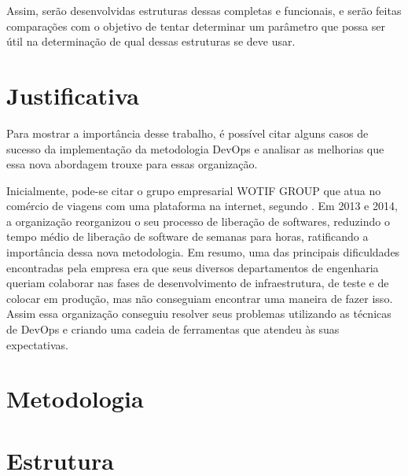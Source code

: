 Assim, serão desenvolvidas estruturas dessas completas e 
funcionais, e serão feitas comparações com o objetivo de 
tentar determinar um parâmetro que possa ser útil na 
determinação de qual dessas estruturas se deve usar.

\section{Justificativa}

Para mostrar a importância desse trabalho, é possível citar 
alguns casos de sucesso da implementação da metodologia DevOps 
e analisar as melhorias que essa nova abordagem trouxe 
para essas organização.

Inicialmente, pode-se citar o grupo empresarial WOTIF GROUP que 
atua no comércio de viagens com uma plataforma na internet, 
segundo \cite{callanandevops}. Em 2013 e 2014, a organização 
reorganizou o seu processo de liberação de softwares, reduzindo 
o tempo médio de liberação de software de semanas para horas, 
ratificando a importância dessa nova metodologia. Em resumo, 
uma das principais dificuldades encontradas pela empresa era 
que seus diversos departamentos de engenharia queriam colaborar 
nas fases de desenvolvimento de infraestrutura, de teste e de 
colocar em produção, mas não conseguiam encontrar uma maneira 
de fazer isso. Assim essa organização conseguiu resolver seus 
problemas utilizando as técnicas de DevOps e criando uma cadeia 
de ferramentas que atendeu às suas expectativas.

\section{Metodologia}

\section{Estrutura}